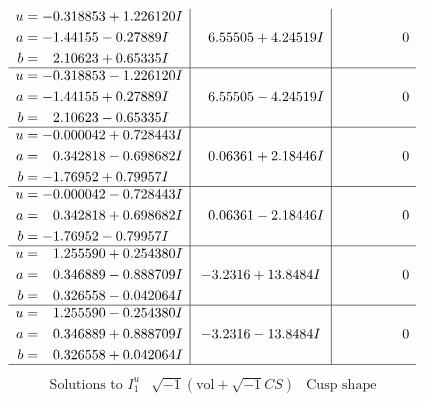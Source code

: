\documentclass[1p]{elsarticle_modified}
\theoremstyle{definition}
\newcommand{\I}{\sqrt{-1}}
\begin{document}
$$\begin{array}{c|c|c}
\begin{aligned}
u &= -0.318853 + 1.226120 I \\
a &= -1.44155 - 0.27889 I \\
b &= \phantom{-}2.10623 + 0.65335 I\end{aligned}
 & \phantom{-}6.55505 + 4.24519 I & \phantom{-0.000000 } 0 \\ \hline\begin{aligned}
u &= -0.318853 - 1.226120 I \\
a &= -1.44155 + 0.27889 I \\
b &= \phantom{-}2.10623 - 0.65335 I\end{aligned}
 & \phantom{-}6.55505 - 4.24519 I & \phantom{-0.000000 } 0 \\ \hline\begin{aligned}
u &= -0.000042 + 0.728443 I \\
a &= \phantom{-}0.342818 - 0.698682 I \\
b &= -1.76952 + 0.79957 I\end{aligned}
 & \phantom{-}0.06361 + 2.18446 I & \phantom{-0.000000 } 0 \\ \hline\begin{aligned}
u &= -0.000042 - 0.728443 I \\
a &= \phantom{-}0.342818 + 0.698682 I \\
b &= -1.76952 - 0.79957 I\end{aligned}
 & \phantom{-}0.06361 - 2.18446 I & \phantom{-0.000000 } 0 \\ \hline\begin{aligned}
u &= \phantom{-}1.255590 + 0.254380 I \\
a &= \phantom{-}0.346889 - 0.888709 I \\
b &= \phantom{-}0.326558 - 0.042064 I\end{aligned}
 & -3.2316 + 13.8484 I & \phantom{-0.000000 } 0 \\ \hline\begin{aligned}
u &= \phantom{-}1.255590 - 0.254380 I \\
a &= \phantom{-}0.346889 + 0.888709 I \\
b &= \phantom{-}0.326558 + 0.042064 I\end{aligned}
 & -3.2316 - 13.8484 I & \phantom{-0.000000 } 0\\
 \hline 
 \end{array}$$\newpage$$\begin{array}{c|c|c}  
\text{Solutions to }I^u_{1}& \I (\text{vol} + \sqrt{-1}CS) & \text{Cusp shape}\\
 \hline 
\begin{aligned}

\end{aligned}
\end{array}$$
\end{document}
